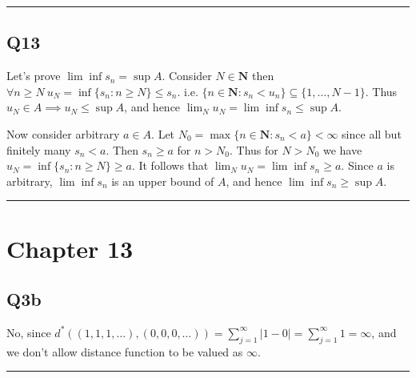 \documentclass[12pt, lettersize]{article}
\newcommand{\N}{\mathbf{N}}
\newcommand{\lline}{\noindent\rule{\textwidth}{1pt}}
\begin{document}
	\lline
	
	\subsection*{Q13}
	Let's prove $\lim\inf s_n=\sup A$. Consider $N\in\N$ then $\forall n\geq N\ u_N=\inf\{s_n: n\geq N\}\leq s_n$. i.e. $\{n\in\N: s_n<u_n\}\subseteq\{1,\dots,N-1\}$. Thus $u_N\in A\implies u_N\leq\sup A$, and hence $\lim_Nu_N=\lim\inf s_n\leq\sup A$.
	
	Now consider arbitrary $a\in A$. Let $N_0=\max\{n\in\N: s_n<a\}<\infty$ since all but finitely many $s_n<a$. Then $s_n\geq a$ for $n>N_0$. Thus for $N>N_0$ we have $u_N=\inf\{s_n: n\geq N\}\geq a$. It follows that $\lim_Nu_N=\lim\inf s_n\geq a$. Since $a$ is arbitrary, $\lim\inf s_n$ is an upper bound of $A$, and hence $\lim\inf s_n\geq\sup A$.
	
	\lline
	
	\section*{Chapter 13}
	\subsection*{Q3b}
	No, since $d^\ast((1,1,1,\dots),(0,0,0,\dots))=\sum_{j=1}^{\infty}|1-0|=\sum_{j=1}^{\infty}1=\infty$, and we don't allow distance function to be valued as $\infty$.
	
	\lline
	
	\setcounter{equation}{0}
\end{document}
